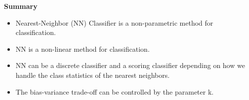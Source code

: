 \textbf{Summary}
\begin{itemize}[noitemsep]
    \item Nearest-Neighbor (NN) Classifier is a non-parametric method for classification.
    \item NN is a non-linear method for classification.
    \item NN can be a discrete classifier and a scoring classifier depending on how we handle the class statistics of the nearest neighbors.
    \item The bias-variance trade-off can be controlled by the parameter k.
\end{itemize}
